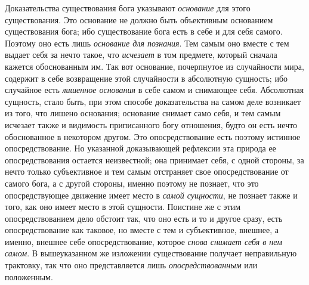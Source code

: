 Доказательства существования бога указывают
{\em основание} для этого существования. Это основание
не должно быть объективным основанием существования бога; ибо существование
бога есть в себе и для себя самого. Поэтому оно есть лишь
{\em основание для познания}. Тем самым оно вместе с
тем выдает себя за нечто такое, что {\em исчезает} в
том предмете, который сначала кажется обоснованным им. Так вот основание,
почерпнутое из случайности мира, содержит в себе возвращение этой
случайности в абсолютную сущность; ибо случайное есть
{\em лишенное основания} в себе самом и снимающее себя.
Абсолютная сущность, стало быть, при этом способе доказательства на самом
деле возникает из того, что лишено основания; основание снимает само себя,
и тем самым исчезает также и видимость приписанного богу отношения, будто
он есть нечто обоснованное в некотором другом. Это опосредствование есть
поэтому истинное опосредствование. Но указанной доказывающей рефлексии эта
природа ее опосредствования остается неизвестной; она принимает себя, с
одной стороны, за нечто только субъективное и тем самым отстраняет свое
опосредствование от самого бога, а с другой стороны, именно поэтому не
познает, что это опосредствующее движение имеет место в
{\em самой сущности}, не познает также и того, как оно
имеет место в этой сущности. Поистине же с этим опосредствованием дело
обстоит так, что оно есть и то и другое сразу, есть опосредствование как
таковое, но вместе с тем и субъективное, внешнее, а именно, внешнее себе
опосредствование, которое {\em снова снимает себя в нем
самом}. В вышеуказанном же изложении существование получает неправильную
трактовку, так что оно представляется лишь
{\em опосредствованным} или положенным.

